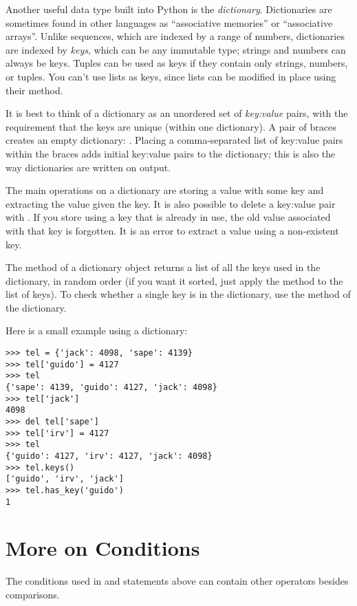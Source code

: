\documentclass{manual}
\begin{document}
Another useful data type built into Python is the \emph{dictionary}.
Dictionaries are sometimes found in other languages as ``associative
memories'' or ``associative arrays''.  Unlike sequences, which are
indexed by a range of numbers, dictionaries are indexed by \emph{keys},
which can be any immutable type; strings and numbers can always be
keys.  Tuples can be used as keys if they contain only strings,
numbers, or tuples.  You can't use lists as keys, since lists can be
modified in place using their  method.

It is best to think of a dictionary as an unordered set of
\emph{key:value} pairs, with the requirement that the keys are unique
(within one dictionary).
A pair of braces creates an empty dictionary: \code{\{\}}.
Placing a comma-separated list of key:value pairs within the
braces adds initial key:value pairs to the dictionary; this is also the
way dictionaries are written on output.

The main operations on a dictionary are storing a value with some key
and extracting the value given the key.  It is also possible to delete
a key:value pair
with .
If you store using a key that is already in use, the old value
associated with that key is forgotten.  It is an error to extract a
value using a non-existent key.

The  method of a dictionary object returns a list of all
the keys used in the dictionary, in random order (if you want it
sorted, just apply the  method to the list of keys).  To
check whether a single key is in the dictionary, use the
 method of the dictionary.

Here is a small example using a dictionary:

\begin{verbatim}
>>> tel = {'jack': 4098, 'sape': 4139}
>>> tel['guido'] = 4127
>>> tel
{'sape': 4139, 'guido': 4127, 'jack': 4098}
>>> tel['jack']
4098
>>> del tel['sape']
>>> tel['irv'] = 4127
>>> tel
{'guido': 4127, 'irv': 4127, 'jack': 4098}
>>> tel.keys()
['guido', 'irv', 'jack']
>>> tel.has_key('guido')
1
\end{verbatim}

\section{More on Conditions \label{conditions}}

The conditions used in  and  statements above can
contain other operators besides comparisons.
\end{document}
